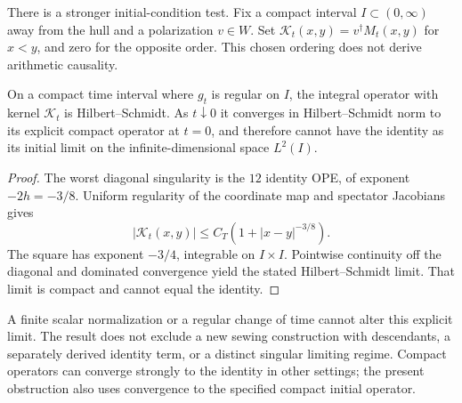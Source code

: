 There is a stronger initial-condition test. Fix a compact interval
$I\subset(0,\infty)$ away from the hull and a polarization $v\in W$.
Set $\mathcal K_t(x,y)=v^\dagger M_t(x,y)$ for $x<y$, and zero for the
opposite order. This chosen ordering does not derive arithmetic causality.

\begin{proposition}
On a compact time interval where $g_t$ is regular on $I$, the integral
operator with kernel $\mathcal K_t$ is Hilbert--Schmidt. As $t\downarrow0$
it converges in Hilbert--Schmidt norm to its explicit compact operator at
$t=0$, and therefore cannot have the identity as its initial limit on
the infinite-dimensional space $L^2(I)$.
\end{proposition}
\begin{proof}
The worst diagonal singularity is the $12$ identity OPE, of exponent
$-2h=-3/8$. Uniform regularity of the coordinate map and spectator
Jacobians gives
\begin{equation}
 |\mathcal K_t(x,y)|\le C_T(1+|x-y|^{-3/8}).
\end{equation}
The square has exponent $-3/4$, integrable on $I\times I$. Pointwise
continuity off the diagonal and dominated convergence yield the stated
Hilbert--Schmidt limit. That limit is compact and cannot equal the identity.
\end{proof}

A finite scalar normalization or a regular change of time cannot alter
this explicit limit. The result does not exclude a new sewing construction
with descendants, a separately derived identity term, or a distinct
singular limiting regime. Compact operators can converge strongly to the
identity in other settings; the present obstruction also uses convergence
to the specified compact initial operator.

